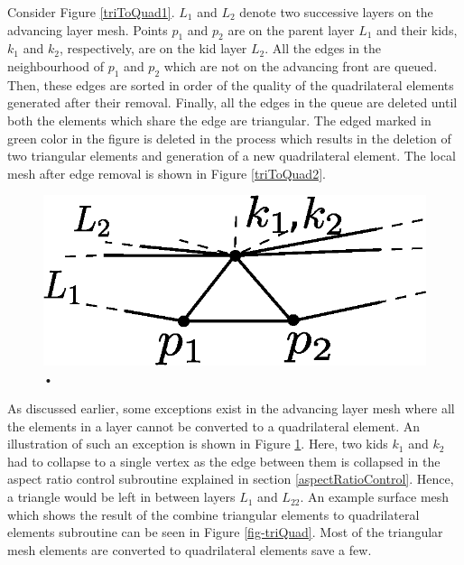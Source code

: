 Consider Figure \ref{triToQuad1}. $L_1$ and $L_2$ denote two successive layers on the advancing layer mesh. Points $p_1$ and $p_2$ are on the parent layer $L_1$ and their kids, $k_1$ and $k_2$, respectively, are on the kid layer $L_2$. All the edges in the neighbourhood of $p_1$ and $p_2$ which are not on the advancing front are queued. Then, these edges are sorted in order of the quality of the quadrilateral elements generated after their removal. Finally, all the edges in the queue are deleted until both the elements which share the edge are triangular. The edged marked in green color in the figure is deleted in the process which results in the deletion of two triangular elements and generation of a new quadrilateral element. The local mesh after edge removal is shown in Figure \ref{triToQuad2}.

\vspace{10pt}
\begin{figure}[hbt!]
  \centering
  \includegraphics[width=0.5\linewidth]{img/m2/combineTriToQuad3.eps}
  \caption{•}
  \label{triLeft}
\end{figure}

As discussed earlier, some exceptions exist in the advancing layer mesh where all the elements in a layer cannot be converted to a quadrilateral element. An illustration of such an exception is shown in Figure \ref{triLeft}. Here, two kids $k_1$ and $k_2$ had to collapse to a single vertex as the edge between them is collapsed in the aspect ratio control subroutine explained in section \ref{aspectRatioControl}. Hence, a triangle would be left in between layers $L_1$ and $L_22$. An example surface mesh which shows the result of the combine triangular elements to quadrilateral elements subroutine can be seen in Figure \ref{fig-triQuad}. Most of the triangular mesh elements are converted to quadrilateral elements save a few.

